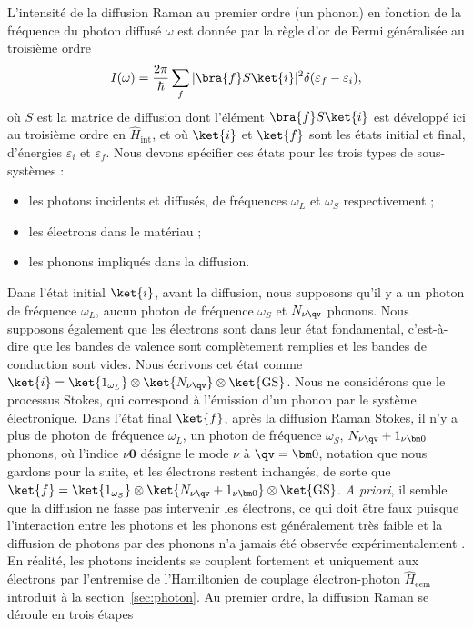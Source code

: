 L'intensité de la diffusion Raman au premier ordre (un phonon) en fonction de la fréquence du photon diffusé $\omega$ est donnée par la règle d'or de Fermi généralisée au troisième ordre~\cite{heitlerQuantumTheoryRadiation1954}
\begin{equation}
    I(\omega) = \frac{2\pi}{\hbar}\sum_f|\bra{f}S\ket{i}|^2\delta(\varepsilon_f-\varepsilon_i),\label{eqn:fermi3}
\end{equation}
où $S$ est la matrice de diffusion dont l'élément $\bra{f}S\ket{i}$ est développé ici au troisième ordre en $\hat{H}_\text{int}$, et où $\ket{i}$ et $\ket{f}$ sont les états initial et final, d'énergies $\varepsilon_i$ et $\varepsilon_f$. Nous devons spécifier ces états pour les trois types de sous-systèmes : 
\begin{itemize}
    \item les photons incidents et diffusés, de fréquences $\omega_L$ et $\omega_S$ respectivement ;
    \item les électrons dans le matériau ;
    \item les phonons impliqués dans la diffusion.
\end{itemize}
Dans l'état initial $\ket{i}$, avant la diffusion, nous supposons qu'il y a un photon de fréquence $\omega_L$, aucun photon de fréquence $\omega_S$ et $N_{\nu\qv}$ phonons. Nous supposons également que les électrons sont dans leur état fondamental, c'est-à-dire que les bandes de valence sont complètement remplies et les bandes de conduction sont vides. Nous écrivons cet état comme $\ket{i}=\ket{1_{\omega_L}}\otimes\ket{N_{\nu\qv}}\otimes\ket{\text{GS}}$. Nous ne considérons que le processus Stokes, qui correspond à l'émission d'un phonon par le système électronique. Dans l'état final $\ket{f}$, après la diffusion Raman Stokes, il n'y a plus de photon de fréquence $\omega_L$, un photon de fréquence $\omega_S$, $N_{\nu\qv}+1_{\nu\bm 0}$ phonons, où l'indice $\nu\bm 0$ désigne le mode $\nu$ à $\qv=\bm 0$, notation que nous gardons pour la suite, et les électrons restent inchangés, de sorte que $\ket{f}=\ket{1_{\omega_S}}\otimes\ket{N_{\nu\qv}+1_{\nu\bm 0}}\otimes\ket{\text{GS}}$. \textit{A priori}, il semble que la diffusion ne fasse pas intervenir les électrons, ce qui doit être faux puisque l'interaction entre les photons et les phonons est généralement très faible et la diffusion de photons par des phonons n'a jamais été observée expérimentalement \cite{yuFundamentalsSemiconductorsPhysics2010}. En réalité, les photons incidents se couplent fortement et uniquement aux électrons par l'entremise de l'Hamiltonien de couplage électron-photon $\hat{H}_\text{eem}$ introduit à la section~\ref{sec:photon}. Au premier ordre, la diffusion Raman se déroule en trois étapes
